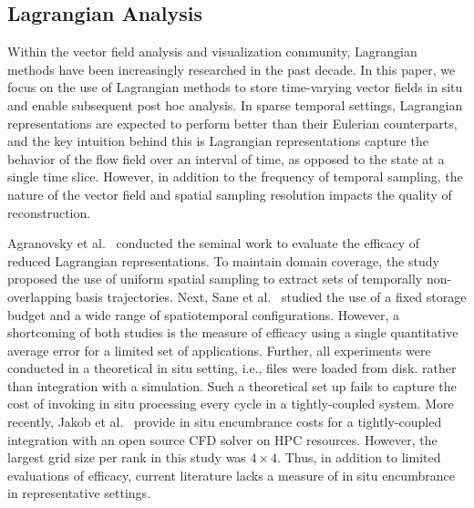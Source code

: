 \subsection{Lagrangian Analysis}
Within the vector field analysis and visualization community, Lagrangian methods have been increasingly researched in the past decade. 
%
In this paper, we focus on the use of Lagrangian methods to store time-varying vector fields in situ and enable subsequent post hoc analysis.
%
%
In sparse temporal settings, Lagrangian representations are expected to perform better than their Eulerian counterparts, and the key intuition behind this is Lagrangian representations capture the behavior of the flow field over an interval of time, as opposed to the state at a single time slice.
%
However, in addition to the frequency of temporal sampling, the nature of the vector field and spatial sampling resolution impacts the quality of reconstruction.
%

Agranovsky et al.~\cite{agranovsky2014improved} conducted the seminal work to evaluate the efficacy of reduced Lagrangian representations.
%
To maintain domain coverage, the study proposed the use of uniform spatial sampling to extract sets of temporally non-overlapping basis trajectories.
%
Next, Sane et al.~\cite{sane2018revisiting} studied the use of a fixed storage budget and a wide range of spatiotemporal configurations.
%
However, a shortcoming of both studies is the measure of efficacy using a single quantitative average error for a limited set of applications.
%
Further, all experiments were conducted in a theoretical in situ setting, i.e., files were loaded from disk. rather than integration with a simulation. 
%
Such a theoretical set up fails to capture the cost of invoking in situ processing every cycle in a tightly-coupled system.
%
More recently, Jakob et al.~\cite{Jakob20} provide in situ encumbrance costs for a tightly-coupled integration with an open source CFD solver on HPC resources.
%
However, the largest grid size per rank in this study was $4\times4$.
%
Thus, in addition to limited evaluations of efficacy, current literature lacks a measure of in situ encumbrance in representative settings.
%

